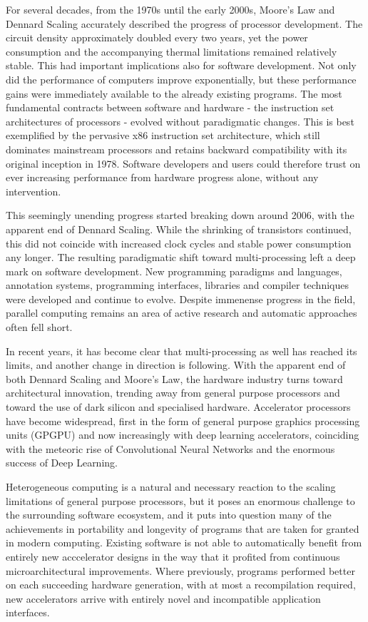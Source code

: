     For several decades, from the 1970s until the early 2000s, Moore's Law and
    Dennard Scaling accurately described the progress of processor development.
    The circuit density approximately doubled every two years, yet the power
    consumption and the accompanying thermal limitations remained relatively
    stable.
    This had important implications also for software development.
    Not only did the performance of computers improve exponentially, but these
    performance gains were immediately available to the already existing
    programs.
    The most fundamental contracts between software and hardware - the
    instruction set architectures of processors - evolved without paradigmatic
    changes.
    This is best exemplified by the pervasive x86 instruction set architecture,
    which still dominates mainstream processors and retains backward
    compatibility with its original inception in 1978.
    Software developers and users could therefore trust on ever increasing
    performance from hardware progress alone, without any intervention.

    This seemingly unending progress started breaking down around 2006,
    with the apparent end of Dennard Scaling.
    While the shrinking of transistors continued, this did not coincide with
    increased clock cycles and stable power consumption any longer.
    The resulting paradigmatic shift toward multi-processing left a deep mark on
    software development.
    New programming paradigms and languages, annotation systems, programming
    interfaces, libraries and compiler techniques were developed and continue to
    evolve.
    Despite immenense progress in the field, parallel computing remains an area
    of active research and automatic approaches often fell short.

    In recent years, it has become clear that multi-processing as well has
    reached its limits, and another change in direction is following.
    With the apparent end of both Dennard Scaling and Moore's Law, the hardware
    industry turns toward architectural innovation, trending away from general
    purpose processors and toward the use of dark silicon and specialised
    hardware.
    Accelerator processors have become widespread, first in the form of general
    purpose graphics processing units (GPGPU) and now increasingly with deep
    learning accelerators, coinciding with the meteoric rise of
    Convolutional Neural Networks and the enormous success of Deep Learning.

    Heterogeneous computing is a natural and necessary reaction to the scaling
    limitations of general purpose processors, but it poses an enormous
    challenge to the surrounding software ecosystem, and it puts into question
    many of the achievements in portability and longevity of programs that are
    taken for granted in modern computing.
    Existing software is not able to automatically benefit from entirely new
    acccelerator designs in the way that it profited from continuous
    microarchitectural improvements.
    Where previously, programs performed better on each succeeding hardware
    generation, with at most a recompilation required, new accelerators arrive
    with entirely novel and incompatible application interfaces.

